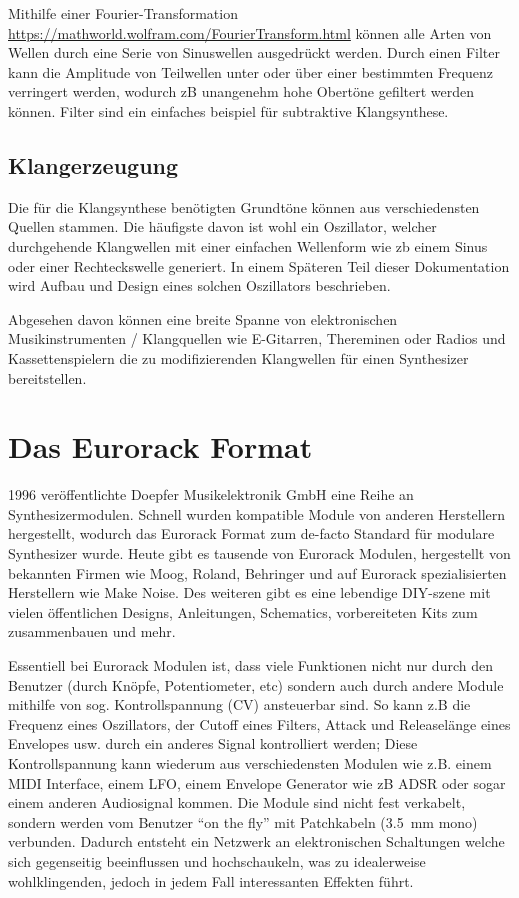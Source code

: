 Mithilfe einer Fourier-Transformation \url{https://mathworld.wolfram.com/FourierTransform.html} können alle Arten von Wellen durch eine Serie von Sinuswellen ausgedrückt werden. Durch einen Filter kann die Amplitude von Teilwellen unter oder über einer bestimmten Frequenz verringert werden, wodurch zB unangenehm hohe Obertöne gefiltert werden können. Filter sind ein einfaches beispiel für subtraktive Klangsynthese.

\subsection{Klangerzeugung}
\label{sec:orgdd49c80}
Die für die Klangsynthese benötigten Grundtöne können aus verschiedensten Quellen stammen. Die häufigste davon ist wohl ein Oszillator, welcher durchgehende Klangwellen mit einer einfachen Wellenform wie zb einem Sinus oder einer Rechteckswelle generiert. In einem Späteren Teil dieser Dokumentation wird Aufbau und Design eines solchen Oszillators beschrieben.

Abgesehen davon können eine breite Spanne von elektronischen Musikinstrumenten / Klangquellen wie E-Gitarren, Thereminen oder Radios und Kassettenspielern die zu modifizierenden Klangwellen für einen Synthesizer bereitstellen.

\section{Das Eurorack Format}
\label{sec:org44116e9}

1996 veröffentlichte Doepfer Musikelektronik GmbH eine Reihe an Synthesizermodulen. Schnell wurden kompatible Module von anderen Herstellern hergestellt, wodurch das Eurorack Format zum de-facto Standard für modulare Synthesizer wurde. Heute gibt es tausende von Eurorack Modulen, hergestellt von bekannten Firmen wie Moog, Roland, Behringer und auf Eurorack spezialisierten Herstellern wie Make Noise. Des weiteren gibt es eine lebendige DIY-szene mit vielen öffentlichen Designs, Anleitungen, Schematics, vorbereiteten Kits zum zusammenbauen und mehr.

Essentiell bei Eurorack Modulen ist, dass viele Funktionen nicht nur durch den Benutzer (durch Knöpfe, Potentiometer, etc) sondern auch durch andere Module mithilfe von sog. Kontrollspannung (CV) ansteuerbar sind. So kann z.B die Frequenz eines Oszillators, der Cutoff eines Filters, Attack und Releaselänge eines Envelopes usw. durch ein anderes Signal kontrolliert werden; Diese Kontrollspannung kann wiederum aus verschiedensten Modulen wie z.B. einem MIDI Interface, einem LFO, einem Envelope Generator wie zB ADSR oder sogar einem anderen Audiosignal kommen. Die Module sind nicht fest verkabelt, sondern werden vom Benutzer ``on the fly'' mit Patchkabeln (\SI{3.5}{\mm} mono) verbunden. Dadurch entsteht ein Netzwerk an elektronischen Schaltungen welche sich gegenseitig beeinflussen und hochschaukeln, was zu idealerweise wohlklingenden, jedoch in jedem Fall interessanten Effekten führt.

